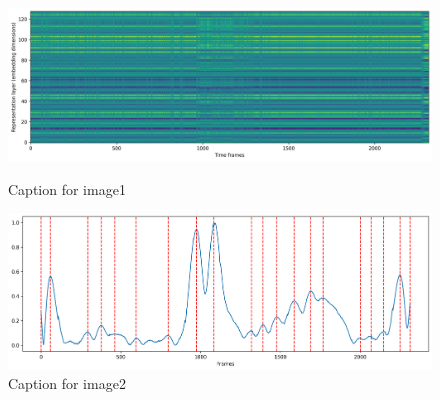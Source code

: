 \begin{figure}[ht]
  \centering
  \begin{minipage}[b]{.8\linewidth}
    \centering
    \includegraphics[width=\linewidth]{figures/images/salami_391_embeddiogram.png}
    \caption[]{Caption for image1}
    \label{fig:image1}
  \end{minipage}

  \begin{minipage}[b]{.8\linewidth}
    \centering
    \includegraphics[width=\linewidth]{figures/images/samali_391_novelty_curve_peaks.png}
    \caption[]{Caption for image2}
    \label{fig:image2}
  \end{minipage}
\end{figure}


